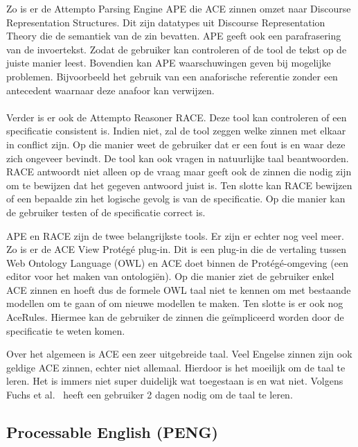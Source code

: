 Zo is er de Attempto Parsing Engine APE die ACE zinnen omzet naar Discourse Representation Structures. Dit zijn datatypes uit Discourse Representation Theory die de semantiek van de zin bevatten. APE geeft ook een parafrasering van de invoertekst. Zodat de gebruiker kan controleren of de tool de tekst op de juiste manier leest. Bovendien kan APE waarschuwingen geven bij mogelijke problemen. Bijvoorbeeld het gebruik van een anaforische referentie zonder een antecedent waarnaar deze anafoor kan verwijzen.

\paragraph{} Verder is er ook de Attempto Reasoner RACE. Deze tool kan controleren of een specificatie consistent is. Indien niet, zal de tool zeggen welke zinnen met elkaar in conflict zijn. Op die manier weet de gebruiker dat er een fout is en waar deze zich ongeveer bevindt. De tool kan ook vragen in natuurlijke taal beantwoorden. RACE antwoordt niet alleen op de vraag maar geeft ook de zinnen die nodig zijn om te bewijzen dat het gegeven antwoord juist is. Ten slotte kan RACE bewijzen of een bepaalde zin het logische gevolg is van de specificatie. Op die manier kan de gebruiker testen of de specificatie correct is.

APE en RACE zijn de twee belangrijkste tools. Er zijn er echter nog veel meer. Zo is er de ACE View Prot\'eg\'e plug-in. Dit is een plug-in die de vertaling tussen Web Ontology Language (OWL) en ACE doet binnen de Prot\'eg\'e-omgeving (een editor voor het maken van ontologi\"en). Op die manier ziet de gebruiker enkel ACE zinnen en hoeft dus de formele OWL taal niet te kennen om met bestaande modellen om te gaan of om nieuwe modellen te maken. Ten slotte is er ook nog AceRules. Hiermee kan de gebruiker de zinnen die ge\"impliceerd worden door de specificatie te weten komen.

Over het algemeen is ACE een zeer uitgebreide taal. Veel Engelse zinnen zijn ook geldige ACE zinnen, echter niet allemaal. Hierdoor is het moeilijk om de taal te leren. Het is immers niet super duidelijk wat toegestaan is en wat niet. Volgens Fuchs et al.\ \cite{Fuchs2008} heeft een gebruiker 2 dagen nodig om de taal te leren.

\subsection{Processable English (PENG)}
